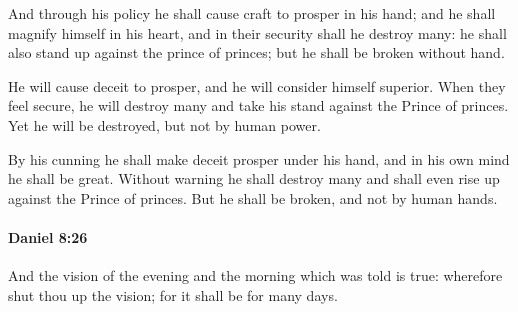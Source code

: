 			\begin{versebox}
					\item[BHS] 
					\item[LXX] 
					\item[ASV] And through his policy he shall cause craft to prosper in his hand; and he shall magnify himself in his heart, and in their security shall he destroy many: he shall also stand up against the prince of princes; but he shall be broken without hand.
					\item[NIV] He will cause deceit to prosper, and he will consider himself superior. When they feel secure, he will destroy many and take his stand against the Prince of princes. Yet he will be destroyed, but not by human power.
					\item[NRSV] By his cunning he shall make deceit prosper under his hand, and in his own mind he shall be great. Without warning he shall destroy many and shall even rise up against the Prince of princes. But he shall be broken, and not by human hands.
			\end{versebox}

		\paragraph{Daniel 8:26} %
			\label{DANIEL-8-26}

			And the vision of the evening and the morning which was told is true: wherefore shut thou up the vision; for it shall be for many days.


